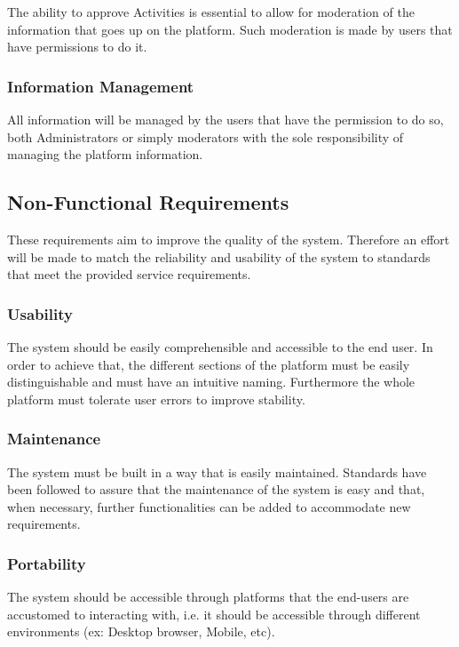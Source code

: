 \documentclass[a4paper,12pt,journal,twoside,compsoc]{PPIEEEtran}
\begin{document}
The ability to approve Activities is essential to allow for moderation of the information that goes up on the platform. Such moderation is made by users that have permissions to do it.

\subsubsection{Information Management}

All information will be managed by the users that have the permission to do so, both Administrators or simply moderators with the sole responsibility of managing the platform information.

\subsection{Non-Functional Requirements}

These requirements aim to improve the quality of the system. Therefore an effort will be made to match the reliability and usability of the system to standards that meet the provided service requirements.

\subsubsection{Usability}

The system should be easily comprehensible and accessible to the end user. In order to achieve that, the different sections of the platform must be easily distinguishable and must have an intuitive naming. Furthermore the whole platform must tolerate user errors to improve stability.

\subsubsection{Maintenance}

The system must be built in a way that is easily maintained. Standards have been followed to assure that the maintenance of the system is easy and that, when necessary, further functionalities can be added to accommodate new requirements.


\subsubsection{Portability}

The system should be accessible through platforms that the end-users are accustomed to interacting with, i.e. it should be accessible through different environments (ex: Desktop browser, Mobile, etc).
\end{document}
